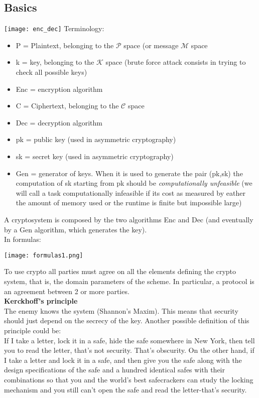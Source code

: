 \documentclass{article}
\begin{document}
\subsection{Basics}

\texttt{[image: enc\_dec]}
Terminology:
\begin{itemize}
    \item P = Plaintext, belonging to the $\mathcal{P}$ space (or message $\mathcal{M}$ space
    \item k = key, belonging to the $\mathcal{K}$ space (brute force attack consists in trying to check all possible keys)
    \item Enc = encryption algorithm
    \item C = Ciphertext, belonging to the $\mathcal{C}$ space
    \item Dec = decryption algorithm
    \item pk = public key (used in asymmetric cryptography)
    \item sk = secret key (used in asymmetric cryptography)
    \item Gen = generator of keys. When it is used to generate the pair (pk,sk) the computation of sk starting from pk should be \textit{computationally unfeasible} (we will call a task computationally infeasible if its cost as measured by eather the amount of memory used or the runtime is finite but impossible large)
\end{itemize}

A cryptosystem is composed by the two algorithms Enc and Dec (and eventually by a Gen algorithm, which generates the key). \\ In formulas:

\texttt{[image: formulas1.png]}

To use crypto all parties must agree on all the elements defining the crypto system, that is, the domain parameters of the scheme. In particular, a protocol is an agreement between 2 or more parties.\\

\textbf{Kerckhoff's principle}\\
The enemy knows the system (Shannon’s Maxim). This means that security should just
depend on the secrecy of the key.
Another possible definition of this principle could be:\\
If I take a letter, lock it in a safe, hide the safe somewhere in New York, then tell you to read the letter, that’s not security. That’s obscurity. On the other hand, if I take a letter and lock it in a safe, and then give you the safe along with the design specifications of the safe and a hundred identical safes with their combinations so that you and the world’s best safecrackers can study the locking mechanism and you still can’t open the safe and read the letter-that’s security.
\end{document}
